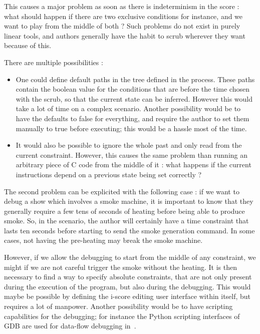 \documentclass{sigchi}
\begin{document}
This causes a major problem as soon as there is indeterminism in the score : what should happen if there are two exclusive conditions for instance, and we want to play from the middle of both ? Such problems do not exist in purely linear tools, and authors generally have the habit to scrub wherever they want because of this.

There are multiple possibilities : 

\begin{itemize}
    \item One could define default paths in the tree defined in the process. These paths contain the boolean value for the conditions that are before the time chosen with the scrub, so that the current state can be inferred. However this would take a lot of time on a complex scenario.
    Another possibility would be to have the defaults to false for everything, and require the author to set them manually to true before executing; this would be a hassle most of the time.
    \item It would also be possible to ignore the whole past and only read from the current constraint. However, this causes the same problem than running an arbitrary piece of C code from the middle of it : what happens if the current instructions depend on a previous state being set correctly ?
\end{itemize}

The second problem can be explicited with the following case : if we want to debug a show which involves a smoke machine, it is important to know that they generally require a few tens of seconds of heating before being able to produce smoke. So, in the scenario, the author will certainly have a time constraint that lasts ten seconds before starting to send the smoke generation command. In some cases, not having the pre-heating may break the smoke machine.

However, if we allow the debugging to start from the middle of any constraint, we might if we are not careful trigger the smoke without the heating. It is then necessary to find a way to specify absolute constraints, that are not only present during the execution of the program, but also during the debugging. This would maybe be possible by defining the i-score editing user interface within itself, but requires a lot of manpower. Another possibility would be to have scripting capabilities for the debugging; for instance the Python scripting interfaces of GDB are used for data-flow debugging in~\cite{pouget2013interactive}.
\end{document}
